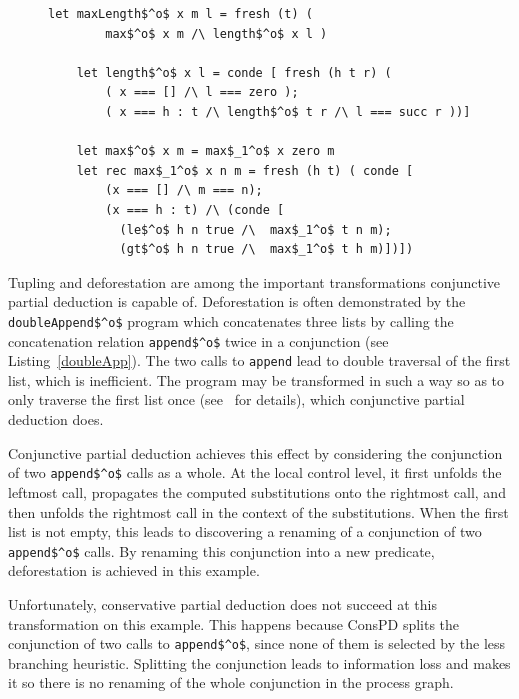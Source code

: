 \begin{figure}[!t]
  \centering
  \begin{minipage}{0.7\textwidth}
    \begin{lstlisting}[label={maxlen}, caption={Inefficient implementation of maxLength$^o$}, captionpos=b, frame=tb]
    let maxLength$^o$ x m l = fresh (t) (
        max$^o$ x m /\ length$^o$ x l )

    let length$^o$ x l = conde [ fresh (h t r) (
        ( x === [] /\ l === zero );
        ( x === h : t /\ length$^o$ t r /\ l === succ r ))]

    let max$^o$ x m = max$_1^o$ x zero m
    let rec max$_1^o$ x n m = fresh (h t) ( conde [
        (x === [] /\ m === n);
        (x === h : t) /\ (conde [
          (le$^o$ h n true /\  max$_1^o$ t n m);
          (gt$^o$ h n true /\  max$_1^o$ t h m)])])
    \end{lstlisting}
  \end{minipage}
\end{figure}

Tupling and deforestation are among the important transformations conjunctive partial deduction is capable of.
Deforestation is often demonstrated by the \lstinline{doubleAppend$^o$} program which concatenates three lists by calling the concatenation relation \lstinline{append$^o$} twice in a conjunction (see Listing~\ref{doubleApp}).
The two calls to \lstinline{append} lead to double traversal of the first list, which is inefficient.
The program may be transformed in such a way so as to only traverse the first list once (see~\cite{de1999conjunctive} for details), which conjunctive partial deduction does.

Conjunctive partial deduction achieves this effect by considering the conjunction of two \lstinline{append$^o$} calls as a whole.
At the local control level, it first unfolds the leftmost call, propagates the computed substitutions onto the rightmost call, and then unfolds the rightmost call in the context of the substitutions.
When the first list is not empty, this leads to discovering a renaming of a conjunction of two \lstinline{append$^o$} calls.
By renaming this conjunction into a new predicate, deforestation is achieved in this example.

Unfortunately, conservative partial deduction does not succeed at this transformation on this example.
This happens because ConsPD splits the conjunction of two calls to \lstinline{append$^o$}, since none of them is selected by the less branching heuristic.
Splitting the conjunction leads to information loss and makes it so there is no renaming of the whole conjunction in the process graph.

